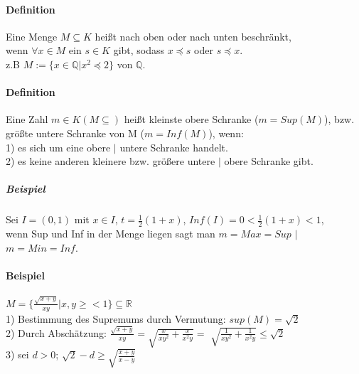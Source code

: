 \documentclass[10pt,a4paper]{scrartcl}
\begin{document}
\paragraph*{Definition}
\begin{tabbing}
Eine Menge $M\subseteq K$ heißt nach oben oder nach unten beschränkt,\\ wenn $\forall x\in M$ ein $s\in K$ gibt, sodass $x\preceq s$ oder $s\preceq x$.\\
z.B $M:=\{x\in \mathbb{Q} | x^{2}\preceq 2\}$ von $\mathbb{Q}$.\\
\end{tabbing}

\paragraph*{Definition}
\begin{tabbing}
Eine Zahl $m\in K (M\subseteq)$ heißt kleinste obere Schranke ($m = Sup(M)$), bzw. größte untere Schranke von M ($m = Inf(M)$), wenn:\\
1) es sich um eine obere $|$ untere Schranke handelt.\\
2) es keine anderen kleinere bzw. größere untere $|$ obere Schranke gibt.\\
\end{tabbing}

\subparagraph*{Beispiel} 
\begin{tabbing}
Sei $I = (0,1)$ mit $x\in I$, $t =\frac{1}{2} (1+x)$, $Inf(I) = 0 <\frac{1}{2} (1+x) < 1$,\\
wenn Sup und Inf in der Menge liegen sagt man $m = Max = Sup$ $|$ $m = Min = Inf$.
\end{tabbing}

\paragraph*{Beispiel}
\begin{tabbing}
 $M =\{\frac{\sqrt{x + y}}{xy} | x,y\geq < 1\}\subseteq \mathbb{R}$\\
 1) Bestimmung des Supremums durch Vermutung: $sup(M) = \sqrt{2}$\\
 2) Durch Abschätzung: $\frac{\sqrt{x+y}}{xy} = \sqrt{\frac{x}{xy^{2}} + \frac{x}{x^{2}y}} = $
 	$\sqrt{\frac{1}{xy^{2}} + \frac{1}{x^{2}y}} \leq \sqrt{2}$\\
 3)	sei $d > 0$; $\sqrt{2} - d\geq \sqrt{\frac{x + y}{x - y}}$\\
\end{tabbing}
\end{document}
